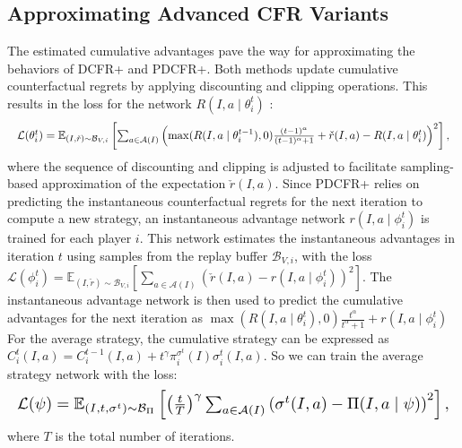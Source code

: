 \documentclass[letterpaper]{article} %
\makeatletter
\renewenvironment{align*}{%
  \linenomath 
  \start@align\@ne\st@rredtrue\m@ne
}{%
  \endalign
  \endlinenomath 
}
\makeatother
\begin{document}
\subsection{Approximating Advanced CFR Variants}
The estimated cumulative advantages pave the way for approximating the behaviors of DCFR+ and PDCFR+. Both methods update cumulative counterfactual regrets by applying discounting and clipping operations. This results in the loss for the network $R(I, a \mid \theta^t_i)$ :
\begin{align*}
    \resizebox{1\linewidth}{!}{$
    \mathcal{L}(\theta^t_i) = \mathbb{E}_{(I, \check{r} )\sim \mathcal{B}_{V, i}}\left[\sum_{a \in \mathcal{A}(I)}^{}\left(\max(R(I, a \mid \theta^{t-1}_{i} ), 0)
    \frac{(t-1)^\alpha}{(t-1)^\alpha + 1} +\check{r}(I, a)-R(I, a\mid\theta_i^t)\right)^2\right],
    $}
\end{align*}
where the sequence of discounting and clipping is adjusted to facilitate sampling-based approximation of the expectation $\check{r}(I, a)$. 
Since PDCFR+ relies on predicting the instantaneous counterfactual regrets for the next iteration to compute a new strategy, an instantaneous advantage network $r(I, a \mid \phi_i^t)$ is trained for each player $i$. This network estimates the instantaneous advantages in iteration $t$ using  samples from the replay buffer $\mathcal{B}_{V, i}$, with the loss
    $\mathcal{L}(\phi_i^t) = \mathbb{E}_{(I, \check{r} )\sim \mathcal{B}_{V, i}}\left[\sum_{a \in \mathcal{A}(I)}^{}\left(\check{r}(I, a)-r(I, a\mid\phi_i^t)\right)^2\right].$
The instantaneous advantage network is then used to predict the cumulative advantages for the next iteration as $
\max\left(R(I, a \mid \theta^t_i), 0\right) \frac{t^\alpha}{t^\alpha + 1} + r(I, a\mid \phi_i^t)$
For the average strategy, the cumulative strategy can be expressed as $C_i^t(I, a) = C_i^{t-1}(I, a)+t^\gamma\pi_i^{\sigma^t}(I)\sigma^t_i(I, a)$.
So we can train the average strategy network with the loss:
\begin{align*}
    \resizebox{1\linewidth}{!}{$
    \mathcal{L}(\psi) = \mathbb{E}_{(I, t, \sigma^{t})\sim \mathcal{B}_{\Pi}}\left[\left(\frac{t}{T}\right)^\gamma \sum_{a\in \mathcal{A}(I)}\left(\sigma^{t}(I, a) - \Pi(I, a \mid \psi)\right)^2\right],
    $}
\end{align*}
where $T$ is the total number of iterations.
\end{document}
